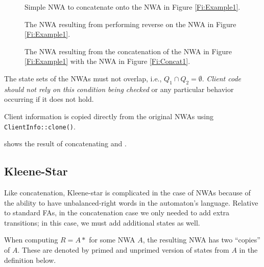 \begin{figure}[p]
  \centering
  \begin{minipage}{0.5\textwidth}
    \begin{minipage}{\textwidth}
      \centering
      \caption{Simple NWA to concatenate onto the NWA in Figure \ref{Fi:Example1}.}
      \label{Fi:Concat1}
    \end{minipage}

    \vspace{2\baselineskip}
    \begin{minipage}{0.8\textwidth}
      \centering
      \caption{The NWA resulting from performing reverse on the NWA in Figure \ref{Fi:Example1}.}
      \label{Fi:Reverse1}
    \end{minipage}
  \end{minipage}
  \begin{minipage}{0.49\textwidth}
    \centering
    \caption{The NWA resulting from the concatenation of the NWA in Figure
      \ref{Fi:Example1} with the NWA in Figure \ref{Fi:Concat1}.}
    \label{Fi:Concat2}
  \end{minipage}
\end{figure}

\antistupidfloats



The state sets of the NWAs must not overlap,
i.e., $Q_1 \cap Q_2 = \emptyset$. \textsl{Client code should not rely on
  this condition being checked} or any particular behavior occurring if it
does not hold.

Client information is copied directly from the original NWAs using
\texttt{ClientInfo::clone()}.

 shows the result of concatenating  and
.


\subsection{Kleene-Star}
\label{Se:Star}

Like concatenation, Kleene-star is complicated in the case of NWAs because of
the ability to have unbalanced-right words in the automaton's
language. Relative to standard FAs, in the concatenation case we only needed
to add extra transitions; in this case, we must add additional states as well.

When computing $R = A*$ for some
NWA $A$, the resulting NWA has two ``copies'' of $A$. These are denoted by
primed and unprimed version of states from $A$ in the definition below. 


